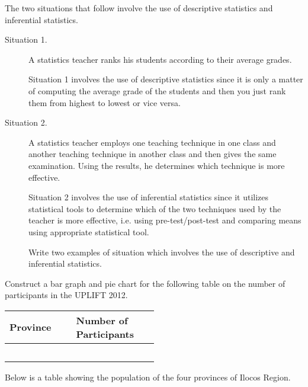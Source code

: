 \begin{myenumerate}
\item The two situations that follow involve the use of descriptive statistics and inferential statistics.
\begin{description}
\item[Situation 1.] A statistics teacher ranks his students according to their average grades.

Situation 1 involves the use of descriptive statistics since it is only a matter of computing
the average grade of the students and then you just rank them from highest to lowest or vice
versa.

\item[Situation 2.] A statistics teacher employs one teaching technique in one class and another
teaching technique in another class and then gives the same examination. Using the results, he
determines which technique is more effective.

Situation 2 involves the use of inferential statistics since it utilizes statistical tools to
determine which of the two techniques used by the teacher is more effective, i.e. using
pre-test/post-test and comparing means using appropriate statistical tool.

Write two examples of situation which involves the use of descriptive and inferential statistics.
\end{description}

\item Construct a bar graph and pie chart for the following table on the number of participants in
the UPLIFT 2012.

\begin{center}
\begin{tabular}{|>{\centering\arraybackslash}p{0.25\linewidth}|>{\centering\arraybackslash}p{0.25\linewidth}|}
\hline \hline
Province & Number of Participants\\
\hline
 & \\ \hline
 & \\ \hline
 & \\ \hline
 & \\ \hline
 & \\ \hline
\end{tabular}
\end{center}

\item Below is a table showing the population of the four provinces of Ilocos Region.


\end{myenumerate}
